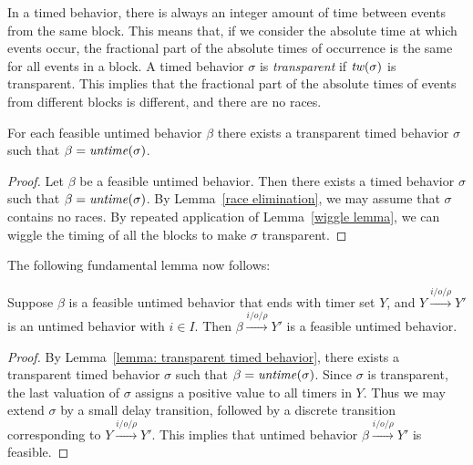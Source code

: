
In a timed behavior, there is always an integer amount of time between events from the same block.
This means that, if we consider the absolute time at which events occur, the fractional part of the absolute times
of occurrence is the same for all events in a block.
A timed behavior $\sigma$ is \emph{transparent} if $\mathit{tw}(\sigma)$ is transparent. This implies that the fractional part of the absolute times of events from different blocks is different, and there are no races.

\begin{lemma}
\label{lemma: transparent timed behavior}
For each feasible untimed behavior $\beta$ there exists
a transparent timed behavior $\sigma$ such that $\beta = \mathit{untime}(\sigma)$.
\end{lemma}
\iflong
\begin{proof}
Let $\beta$ be a feasible untimed behavior.
Then there exists a timed behavior $\sigma$ such that $\beta = \mathit{untime}(\sigma)$.
By Lemma~\ref{race elimination}, we may assume that $\sigma$ contains no races.
By repeated application of Lemma~\ref{wiggle lemma}, we can wiggle the timing of all the blocks to make $\sigma$ transparent.
\end{proof}
\fi

The following fundamental lemma now follows:

\begin{lemma}
\label{feasible plus input is feasible}
Suppose $\beta$ is a feasible untimed behavior that ends with timer set $Y$, and 
$Y \xrightarrow{i/o/\rho} Y'$ is an untimed behavior with $i \in I$.
Then $\beta \xrightarrow{i/o/\rho} Y'$ is a feasible untimed behavior.
\end{lemma}
\iflong
\begin{proof}
By Lemma~\ref{lemma: transparent timed behavior}, there exists a transparent timed behavior
$\sigma$ such that $\beta = \mathit{untime}(\sigma)$. Since $\sigma$ is transparent, the last valuation of $\sigma$ assigns a positive value to
all timers in $Y$. Thus we may extend $\sigma$ by a small delay transition, followed by a discrete transition corresponding to
$Y \xrightarrow{i/o/\rho} Y'$. This implies that untimed behavior $\beta \xrightarrow{i/o/\rho} Y'$ is feasible.
\end{proof}
\fi

\iflong
